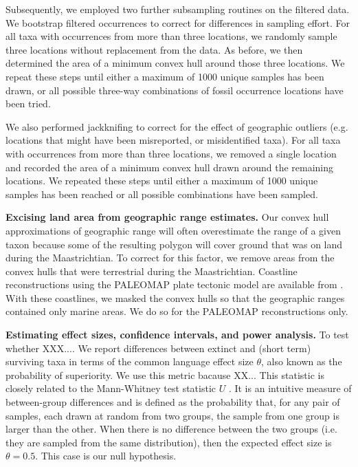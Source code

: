 \documentclass[a4paper]{article}
\begin{document}
Subsequently, we employed two further subsampling routines on the filtered data. We bootstrap filtered occurrences to correct for differences in sampling effort. For all taxa with occurrences from more than three locations, we randomly sample three locations without replacement from the data. As before, we then determined the area of a minimum convex hull around those three locations. We repeat these steps until either a maximum of 1000 unique samples has been drawn, or all possible three-way combinations of fossil occurrence locations have been tried. 

We also performed jackknifing to correct for the effect of geographic outliers (e.g. locations that might have been misreported, or misidentified taxa). For all taxa with occurrences from more than three locations, we removed a single location and recorded the area of a minimum convex hull drawn around the remaining locations. We repeated these steps until either a maximum of 1000 unique samples has been reached or all possible combinations have been sampled. 


\textbf{Excising land area from geographic range estimates.} Our convex hull approximations of geographic range will often overestimate the range of a given taxon because some of the resulting polygon will cover ground that was on land during the Maastrichtian. To correct for this factor, we remove areas from the convex hulls that were terrestrial during the Maastrichtian. Coastline reconstructions using the PALEOMAP plate tectonic model are available from \parencite{kocsisMappingPaleocoastlinesContinental2021}. 
With these coastlines, we masked the convex hulls so that the geographic ranges contained only marine areas. We do so for the PALEOMAP \parencite{scotesePALEOMAPPaleoAtlasGPlates2020} reconstructions only. 

\textbf{Estimating effect sizes, confidence intervals, and power analysis.}
To test whether XXX.... We report differences between extinct and (short term) surviving taxa in terms of the common language effect size $\theta$, also known as the probability of superiority. We use this metric bacause XX...
This statistic is closely related to the Mann-Whitney test statistic $U$ \parencite{permeConfidenceIntervalsMann2019}.
It is an intuitive measure of between-group differences and is defined as the probability that, for any pair of samples, each drawn at random from two groups, the sample from one group is larger than the other.
When there is no difference between the two groups (i.e. they are sampled from the same distribution), then the expected effect size is $\theta = 0.5$. This case is our null hypothesis.
\end{document}
